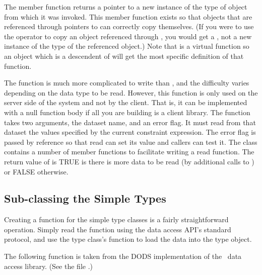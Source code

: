The  member function returns a pointer to a new
instance of the type of object from which it was invoked. This member
function exists so that objects that are referenced through pointers
to  can correctly copy themselves. (If you were to use
the operator  to copy an object referenced through
, you would get a , not a new instance
of the type of the referenced object.) Note that 
is a virtual function so an object which is a descendent of
 will get the most specific definition of that
function.

The  function is much more complicated to write than
, and the difficulty varies depending on the data
type to be read. However, this function is only used on the server
side of the system and not by the client.  That is, it can be
implemented with a null function body if all you are building is a
client library. The  function takes two arguments, the
dataset name, and an error flag.  It must read from that dataset the
values specified by the current constraint expression. The error flag
is passed by reference so that read can set its value and callers can
test it.  The class  contains a number of member
functions to facilitate writing a read function.  The return value of
 is TRUE is there is more data to be read (by additional
calls to ) or FALSE otherwise.

\subsection{Sub-classing the Simple Types}

Creating a  function for the simple type classes is a fairly
straightforward operation.  Simply read the function using the data
access API's standard protocol, and use the type class's 
function to load the data into the type object.

The following function is taken from the DODS implementation of the
\netcdf\ data access library.  (See the file
.)

